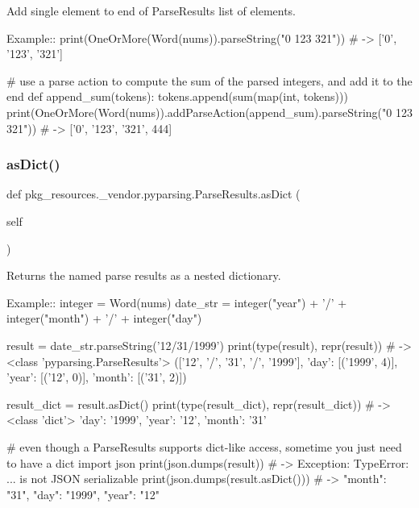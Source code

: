 \begin{DoxyVerb}Add single element to end of ParseResults list of elements.

Example::
    print(OneOrMore(Word(nums)).parseString("0 123 321")) # -> ['0', '123', '321']
    
    # use a parse action to compute the sum of the parsed integers, and add it to the end
    def append_sum(tokens):
tokens.append(sum(map(int, tokens)))
    print(OneOrMore(Word(nums)).addParseAction(append_sum).parseString("0 123 321")) # -> ['0', '123', '321', 444]
\end{DoxyVerb}
 \mbox{\label{classpkg__resources_1_1__vendor_1_1pyparsing_1_1ParseResults_ab73f26af9e7cc95de6dbb0d54d7a81ba}} 
\subsubsection{\texorpdfstring{as\+Dict()}{asDict()}}
{\footnotesize\ttfamily def pkg\+\_\+resources.\+\_\+vendor.\+pyparsing.\+Parse\+Results.\+as\+Dict (\begin{DoxyParamCaption}\item[{}]{self }\end{DoxyParamCaption})}

\begin{DoxyVerb}Returns the named parse results as a nested dictionary.

Example::
    integer = Word(nums)
    date_str = integer("year") + '/' + integer("month") + '/' + integer("day")
    
    result = date_str.parseString('12/31/1999')
    print(type(result), repr(result)) # -> <class 'pyparsing.ParseResults'> (['12', '/', '31', '/', '1999'], {'day': [('1999', 4)], 'year': [('12', 0)], 'month': [('31', 2)]})
    
    result_dict = result.asDict()
    print(type(result_dict), repr(result_dict)) # -> <class 'dict'> {'day': '1999', 'year': '12', 'month': '31'}

    # even though a ParseResults supports dict-like access, sometime you just need to have a dict
    import json
    print(json.dumps(result)) # -> Exception: TypeError: ... is not JSON serializable
    print(json.dumps(result.asDict())) # -> {"month": "31", "day": "1999", "year": "12"}
\end{DoxyVerb}
 \mbox{\label{classpkg__resources_1_1__vendor_1_1pyparsing_1_1ParseResults_aa7e886aa0826871511b189660343f3aa}} 

